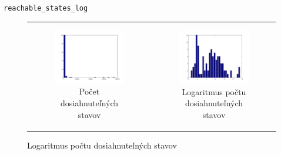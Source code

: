 \documentclass[xcolor={table}]{beamer}
\begin{document}
			\begin{frame}{\texttt{reachable\_states\_log}}
\begin{figure}[H]
    \centering
    \begin{tabular}[c]{cc}
        \begin{subfigure}[c]{0.45\textwidth}
            \includegraphics[width=\textwidth]{images/state.png}
            \caption{Počet dosiahnuteľných stavov}
            \label{fig:state}
        \end{subfigure}&
        \begin{subfigure}[c]{0.45\textwidth}
            \includegraphics[width=\textwidth]{images/state_log.png}
            \caption{Logaritmus počtu dosiahnuteľných stavov}
            \label{fig:logstate}
        \end{subfigure}
    \end{tabular}
\end{figure}			
				
			\end{frame}
\end{document}
